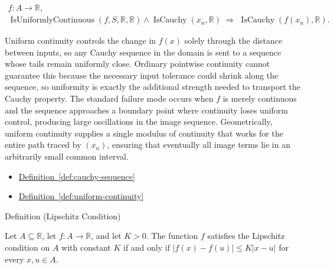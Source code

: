 \begin{remark*}
\[
\begin{aligned}
  f\colon A\to\mathbb{R},\\
\operatorname{IsUniformlyContinuous}(f,S,\mathbb R,\mathbb R) \land \operatorname{IsCauchy}(x_n,\mathbb{R}) \;\Rightarrow\; \operatorname{IsCauchy}(f(x_n),\mathbb{R}).
\end{aligned}
\]
\end{remark*}

\begin{remark*}[Interpretation]
Uniform continuity controls the change in $f(x)$ solely through the distance between inputs, so any Cauchy sequence in the domain is sent to a sequence whose tails remain uniformly close. Ordinary pointwise continuity cannot guarantee this because the necessary input tolerance could shrink along the sequence, so uniformity is exactly the additional strength needed to transport the Cauchy property. The standard failure mode occurs when $f$ is merely continuous and the sequence approaches a boundary point where continuity loses uniform control, producing large oscillations in the image sequence. Geometrically, uniform continuity supplies a single modulus of continuity that works for the entire path traced by $(x_n)$, ensuring that eventually all image terms lie in an arbitrarily small common interval.
\end{remark*}

\begin{dependencies}
\begin{itemize}
  \item \hyperref[def:cauchy-sequence]{Definition~\ref{def:cauchy-sequence}}
  \item \hyperref[def:uniform-continuity]{Definition~\ref{def:uniform-continuity}}
\end{itemize}
\end{dependencies}


\begin{definitionbox}{Definition (Lipschitz Condition)}
\begin{definition}
\label{def:lipschitz-condition}
Let $A \subseteq \mathbb{R}$, let $f:A \to \mathbb{R}$, and let $K>0$. The function $f$ satisfies the Lipschitz condition on $A$ with constant $K$ if and only if $|f(x)-f(u)| \le K|x-u|$ for every $x,u \in A$.
\end{definition}
\end{definitionbox}

